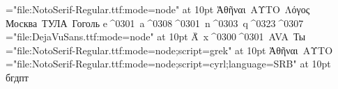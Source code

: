 \font\no="file:NotoSerif-Regular.ttf:mode=node" at 10pt
\hbox{\no Ἀθῆναι ΑΥΤΟ Λόγος}
\hbox{\no Москва ТУЛА Гоголь}
\hbox{\no e^^^^0301 a^^^^0308^^^^0301 n^^^^0303 q^^^^0323^^^^0307}
\font\dj="file:DejaVuSans.ttf:mode=node" at 10pt
\hbox{\dj Ā́ x^^^^0300^^^^0301 AVA Ты}
\font\nogrc="file:NotoSerif-Regular.ttf:mode=node;script=grek" at 10pt
\hbox{\nogrc Ἀθῆναι ΑΥΤΟ}
\font\nosrb="file:NotoSerif-Regular.ttf:mode=node;script=cyrl;language=SRB" at 10pt
\hbox{\nosrb бгдпт}
